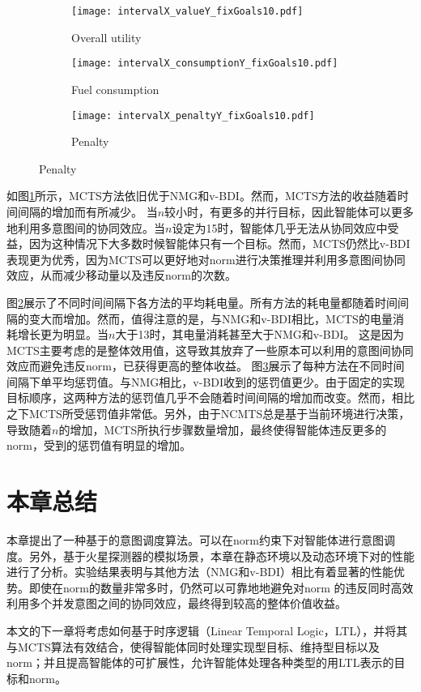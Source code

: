 \begin{figure}
\centering
\begin{subfigure}{.47\textwidth}
\centering
\texttt{[image: intervalX\_valueY\_fixGoals10.pdf]}
\captionsetup{justification=centering}
\caption{Overall utility}
\label{fig:intervalX_valueY_fixGoals10}
\end{subfigure}

\begin{subfigure}{.47\textwidth}
  \centering
  \texttt{[image: intervalX\_consumptionY\_fixGoals10.pdf]}
  \captionsetup{justification=centering}
  \caption{Fuel consumption}
  \label{fig:intervalX_consumptionY_fixGoals10}
\end{subfigure}
\begin{subfigure}{.47\textwidth}
  \centering
  \texttt{[image: intervalX\_penaltyY\_fixGoals10.pdf]}
  \captionsetup{justification=centering}
  \caption{Penalty}
  \label{fig:intervalX_penaltyY_fixGoals10}
\end{subfigure}
\captionsetup{justification=centering}
\label{fig:all_fixGoals10Norms30}
\end{figure}
如图\ref{fig:intervalX_valueY_fixGoals10}所示，MCTS方法依旧优于NMG和v-BDI。然而，MCTS方法的收益随着时间间隔的增加而有所减少。
当$n$较小时，有更多的并行目标，因此智能体可以更多地利用多意图间的协同效应。当$n$设定为15时，智能体几乎无法从协同效应中受益，因为这种情况下大多数时候智能体只有一个目标。然而，MCTS仍然比v-BDI表现更为优秀，因为MCTS可以更好地对norm进行决策推理并利用多意图间协同效应，从而减少移动量以及违反norm的次数。

图\ref{fig:intervalX_consumptionY_fixGoals10}展示了不同时间间隔下各方法的平均耗电量。所有方法的耗电量都随着时间间隔的变大而增加。然而，值得注意的是，与NMG和v-BDI相比，MCTS的电量消耗增长更为明显。当$n$大于13时，其电量消耗甚至大于NMG和v-BDI。
这是因为MCTS主要考虑的是整体效用值，这导致其放弃了一些原本可以利用的意图间协同效应而避免违反norm，已获得更高的整体收益。
图\ref{fig:intervalX_penaltyY_fixGoals10}展示了每种方法在不同时间间隔下单平均惩罚值。与NMG相比，v-BDI收到的惩罚值更少。由于固定的实现目标顺序，这两种方法的惩罚值几乎不会随着时间间隔的增加而改变。然而，相比之下MCTS所受惩罚值非常低。另外，由于NCMTS总是基于当前环境进行决策，导致随着$n$的增加，MCTS所执行步骤数量增加，最终使得智能体违反更多的norm，受到的惩罚值有明显的增加。
\section{本章总结}
本章提出了一种基于\SA 的意图调度算法\SAN 。\SAN 可以在norm约束下对智能体进行意图调度。另外，基于火星探测器的模拟场景，本章在静态环境以及动态环境下对\SAN 的性能进行了分析。实验结果表明\SAN 与其他方法（NMG和v-BDI）相比有着显著的性能优势。即使在norm的数量非常多时，\SAN 仍然可以可靠地地避免对norm
的违反同时高效利用多个并发意图之间的协同效应，最终得到较高的整体价值收益。

本文的下一章将考虑如何基于时序逻辑（Linear Temporal Logic，LTL），并将其与MCTS算法有效结合，使得智能体同时处理实现型目标、维持型目标以及norm；并且提高智能体的可扩展性，允许智能体处理各种类型的用LTL表示的目标和norm。
